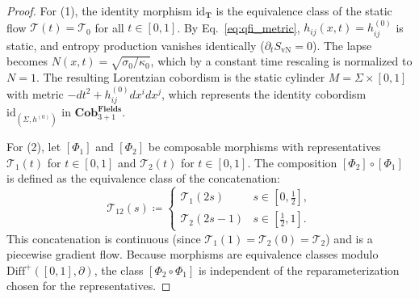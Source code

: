 \documentclass[11pt,a4paper,reqno]{amsart}
\theoremstyle{definition}
\numberwithin{equation}{section}
\newcommand{\Cob}{\mathbf{Cob}_{3+1}^{\mathbf{Fields}}}
\begin{document}
\begin{proof}
For (1), the identity morphism $\mathrm{id}_{\mathbf{T}}$ is the equivalence class of the static flow $\mathcal{T}(t) = \mathcal{T}_0$ for all $t \in [0, 1]$. By Eq.~\eqref{eq:qfi_metric}, $h_{ij}(x, t) = h_{ij}^{(0)}$ is static, and entropy production vanishes identically ($\partial_t S_{\mathrm{vN}} = 0$). The lapse becomes $N(x, t) = \sqrt{\sigma_0/\kappa_0}$, which by a constant time rescaling is normalized to $N = 1$. The resulting Lorentzian cobordism is the static cylinder $M = \Sigma \times [0, 1]$ with metric $-dt^2 + h^{(0)}_{ij} dx^i dx^j$, which represents the identity cobordism $\mathrm{id}_{(\Sigma, h^{(0)})}$ in $\Cob$.

For (2), let $[\Phi_1]$ and $[\Phi_2]$ be composable morphisms with representatives $\mathcal{T}_1(t)$ for $t \in [0, 1]$ and $\mathcal{T}_2(t)$ for $t \in [0, 1]$. The composition $[\Phi_2] \circ [\Phi_1]$ is defined as the equivalence class of the concatenation:
\begin{equation}
    \mathcal{T}_{12}(s) \coloneqq \begin{cases} \mathcal{T}_1(2s) & s \in [0, \tfrac{1}{2}], \\ \mathcal{T}_2(2s - 1) & s \in [\tfrac{1}{2}, 1]. \end{cases}
\end{equation}
This concatenation is continuous (since $\mathcal{T}_1(1) = \mathcal{T}_2(0) = \mathcal{T}_2$) and is a piecewise gradient flow. Because morphisms are equivalence classes modulo $\mathrm{Diff}^+([0, 1], \partial)$, the class $[\Phi_2 \circ \Phi_1]$ is independent of the reparameterization chosen for the representatives.


\end{proof}
\end{document}
